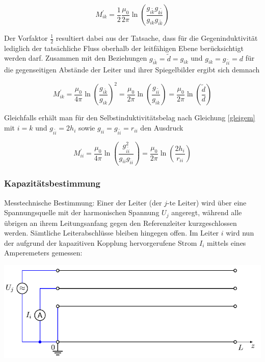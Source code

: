 \begin{equation}
	M_{i k}^{\prime}=\frac{1}{2} \frac{\mu_{0}}{2 \pi} \ln \left(\frac{g_{i \tilde{k}} g_{k \tilde{i}}}{g_{i k} g_{i \tilde{k}}}\right) 
\end{equation}


Der Vorfaktor $\frac{1}{2}$ resultiert dabei aus der Tatsache, dass für die Gegeninduktivität lediglich der tatsächliche Fluss oberhalb der leitfähigen Ebene berücksichtigt werden darf. Zusammen mit den Beziehungen $g_{i \tilde{k}}=\tilde{d}=g_{i k}$ und $g_{i k}=g_{i \tilde{i}}=d$ für die gegenseitigen Abstände der Leiter und ihrer Spiegelbilder ergibt sich demnach


\begin{equation}
	M_{i k}^{\prime}=\frac{\mu_{0}}{4 \pi} \ln \left(\frac{g_{i \tilde{k}}}{g_{i k}}\right)^{2}=\frac{\mu_{0}}{2 \pi} \ln \left(\frac{g_{i \tilde{i}}}{g_{i k}}\right)=\frac{\mu_{0}}{2 \pi} \ln \left(\frac{\tilde{d}}{d}\right) 
\end{equation}


Gleichfalls erhält man für den Selbstinduktivitätsbelag nach Gleichung \ref{gleigem} mit $i=k$ und $g_{i \tilde{i}}=2 h_{i}$ sowie $g_{i i}=g_{i \tilde{i}}=r_{i i}$ den Ausdruck


\begin{equation}
	M_{i i}^{\prime}=\frac{\mu_{0}}{4 \pi} \ln \left(\frac{g_{i \tilde{i}}^{2}}{g_{i i} g_{\tilde{i i}}}\right)=\frac{\mu_{0}}{2 \pi} \ln \left(\frac{2 h_{i}}{r_{i i}}\right) 
\end{equation}

\subsubsection{Kapazitätsbestimmung}
Messtechnische Bestimmung: Einer der Leiter (der $j$-te Leiter) wird über eine Spannungsquelle mit der harmonischen Spannung $U_{j}$ angeregt, während alle übrigen an ihrem Leitungsanfang gegen den Referenzleiter kurzgeschlossen werden. Sämtliche Leiterabschlüsse bleiben hingegen offen. Im Leiter $i$ wird nun der aufgrund der kapazitiven Kopplung hervorgerufene Strom $I_{i}$ mittels eines Amperemeters gemessen:

\begin{center}
	\includegraphics{res/LT13}
\end{center}

